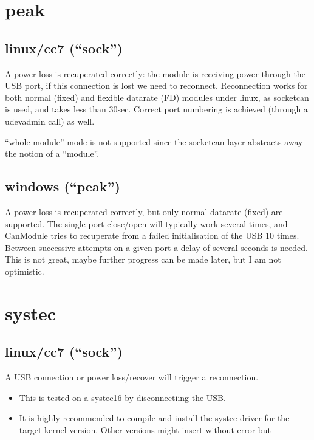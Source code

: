 \documentclass[a4paper,10pt,english]{sphinxmanual}
\begin{document}
\section{peak}
\label{\detokenize{reconnection:peak}}

\subsection{linux/cc7 (“sock”)}
\label{\detokenize{reconnection:linux-cc7-sock}}
\sphinxAtStartPar
A power loss is recuperated correctly: the module is receiving power through the USB port,
if this connection is lost we need to reconnect. Reconnection works for both normal (fixed)
and flexible datarate (FD) modules under linux, as socketcan is used, and takes less than 30sec.
Correct port numbering is achieved (through a udevadmin call) as well.

\sphinxAtStartPar
“whole module”  mode is not supported since
the socketcan layer abstracts away the notion of a “module”.


\subsection{windows (“peak”)}
\label{\detokenize{reconnection:windows-peak}}
\sphinxAtStartPar
A power loss is recuperated correctly, but only normal datarate (fixed) are supported.
The single port close/open will typically work several times, and CanModule tries to
recuperate from a failed initialisation of the USB 10 times. Between successive attempts on a
given port a delay of several seconds is needed. This is not great, maybe further progress
can be made later, but I am not optimistic.


\section{systec}
\label{\detokenize{reconnection:systec}}

\subsection{linux/cc7 (“sock”)}
\label{\detokenize{reconnection:id1}}
\sphinxAtStartPar
A USB connection or power loss/recover will trigger a reconnection.
\begin{itemize}
\item {} 
\sphinxAtStartPar
This is tested on a systec16 by disconnectiing the USB.

\item {} 
\sphinxAtStartPar
It is highly recommended to compile and install the systec driver for the target kernel version. Other versions might insert without error but

\end{itemize}
\end{document}
